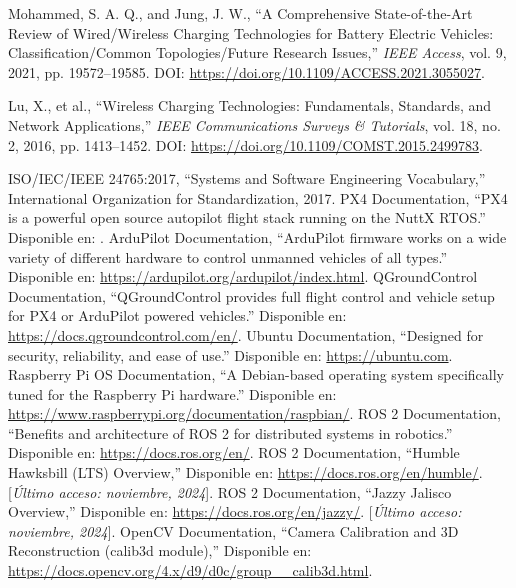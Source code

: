 \begin{thebibliography}{30}
    Mohammed, S. A. Q., and Jung, J. W., ``A Comprehensive State-of-the-Art Review of Wired/Wireless Charging Technologies for Battery Electric Vehicles: Classification/Common Topologies/Future Research Issues,'' \textit{IEEE Access}, vol. 9, 2021, pp. 19572--19585. DOI: \url{https://doi.org/10.1109/ACCESS.2021.3055027}.

    Lu, X., et al., ``Wireless Charging Technologies: Fundamentals, Standards, and Network Applications,'' \textit{IEEE Communications Surveys \& Tutorials}, vol. 18, no. 2, 2016, pp. 1413--1452. DOI: \url{https://doi.org/10.1109/COMST.2015.2499783}.



     ISO/IEC/IEEE 24765:2017, ``Systems and Software Engineering Vocabulary,'' International Organization for Standardization, 2017.
     PX4 Documentation, ``PX4 is a powerful open source autopilot flight stack running on the NuttX RTOS.'' Disponible en: \url{}.
     ArduPilot Documentation, ``ArduPilot firmware works on a wide variety of different hardware to control unmanned vehicles of all types.'' Disponible en: \url{https://ardupilot.org/ardupilot/index.html}.
     QGroundControl Documentation, ``QGroundControl provides full flight control and vehicle setup for PX4 or ArduPilot powered vehicles.'' Disponible en: \url{https://docs.qgroundcontrol.com/en/}. 
     Ubuntu Documentation, ``Designed for security, reliability, and ease of use.'' Disponible en: \url{https://ubuntu.com}. 
     Raspberry Pi OS Documentation, ``A Debian-based operating system specifically tuned for the Raspberry Pi hardware.'' Disponible en: \url{https://www.raspberrypi.org/documentation/raspbian/}.
     ROS 2 Documentation, ``Benefits and architecture of ROS 2 for distributed systems in robotics.'' Disponible en: \url{https://docs.ros.org/en/}. 
    ROS 2 Documentation, ``Humble Hawksbill (LTS) Overview,'' Disponible en: \url{https://docs.ros.org/en/humble/}. [\textit{Último acceso: noviembre, 2024}].
    ROS 2 Documentation, ``Jazzy Jalisco Overview,'' Disponible en: \url{https://docs.ros.org/en/jazzy/}. [\textit{Último acceso: noviembre, 2024}].
    OpenCV Documentation, ``Camera Calibration and 3D Reconstruction (calib3d module),'' Disponible en: \url{https://docs.opencv.org/4.x/d9/d0c/group__calib3d.html}.

\end{thebibliography}

